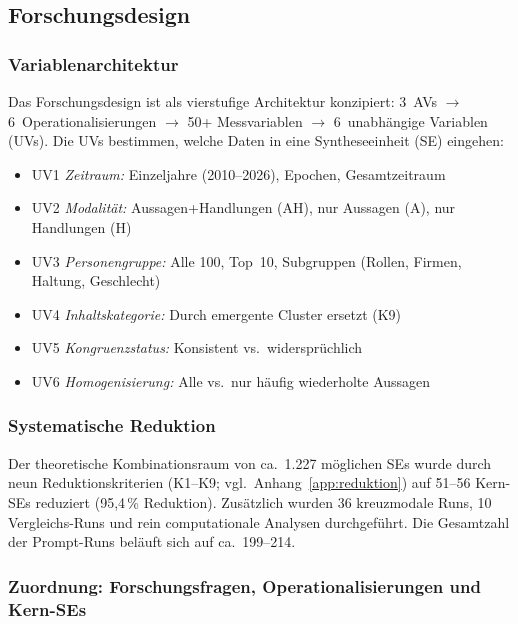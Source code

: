 \documentclass[12pt,a4paper]{article}
\begin{document}
\subsection{Forschungsdesign}
\label{sec:methodik:design}

\subsubsection{Variablenarchitektur}

Das Forschungsdesign ist als vierstufige Architektur konzipiert: 3~AVs $\to$ 6~Operationalisierungen $\to$ 50+ Messvariablen $\to$ 6~unabh\"angige Variablen (UVs). Die UVs bestimmen, welche Daten in eine Syntheseeinheit (SE) eingehen:

\begin{itemize}[nosep]
  \item UV1 \emph{Zeitraum:} Einzeljahre (2010--2026), Epochen, Gesamtzeitraum
  \item UV2 \emph{Modalit\"at:} Aussagen+Handlungen (AH), nur Aussagen (A), nur Handlungen (H)
  \item UV3 \emph{Personengruppe:} Alle 100, Top~10, Subgruppen (Rollen, Firmen, Haltung, Geschlecht)
  \item UV4 \emph{Inhaltskategorie:} Durch emergente Cluster ersetzt (K9)
  \item UV5 \emph{Kongruenzstatus:} Konsistent vs.\ widerspr\"uchlich
  \item UV6 \emph{Homogenisierung:} Alle vs.\ nur h\"aufig wiederholte Aussagen
\end{itemize}

\subsubsection{Systematische Reduktion}

Der theoretische Kombinationsraum von ca.\ 1.227 m\"oglichen SEs wurde durch neun Reduktionskriterien (K1--K9; vgl.\ Anhang~\ref{app:reduktion}) auf 51--56 Kern-SEs reduziert (95,4\,\% Reduktion). Zus\"atzlich wurden 36 kreuzmodale Runs, 10 Vergleichs-Runs und rein computationale Analysen durchgef\"uhrt. Die Gesamtzahl der Prompt-Runs bel\"auft sich auf ca.\ 199--214.

\subsubsection{Zuordnung: Forschungsfragen, Operationalisierungen und Kern-SEs}
\end{document}
